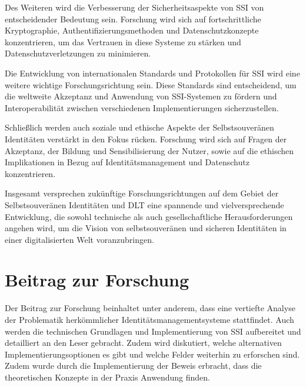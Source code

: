 Des Weiteren wird die Verbesserung der Sicherheitsaspekte von SSI von entscheidender Bedeutung sein. Forschung wird sich auf fortschrittliche Kryptographie, Authentifizierungsmethoden und Datenschutzkonzepte konzentrieren, um das Vertrauen in diese Systeme zu stärken und Datenschutzverletzungen zu minimieren.

Die Entwicklung von internationalen Standards und Protokollen für SSI wird eine weitere wichtige Forschungsrichtung sein. Diese Standards sind entscheidend, um die weltweite Akzeptanz und Anwendung von SSI-Systemen zu fördern und Interoperabilität zwischen verschiedenen Implementierungen sicherzustellen.

Schließlich werden auch soziale und ethische Aspekte der Selbstsouveränen Identitäten verstärkt in den Fokus rücken. Forschung wird sich auf Fragen der Akzeptanz, der Bildung und Sensibilisierung der Nutzer, sowie auf die ethischen Implikationen in Bezug auf Identitätsmanagement und Datenschutz konzentrieren.

Insgesamt versprechen zukünftige Forschungsrichtungen auf dem Gebiet der Selbstsouveränen Identitäten und DLT eine spannende und vielversprechende Entwicklung, die sowohl technische als auch gesellschaftliche Herausforderungen angehen wird, um die Vision von selbstsouveränen und sicheren Identitäten in einer digitalisierten Welt voranzubringen.

\section{Beitrag zur Forschung}
Der Beitrag zur Forschung beinhaltet unter anderem, dass eine vertiefte Analyse der Problematik herkömmlicher Identitätsmanagementsysteme stattfindet. Auch werden die technischen Grundlagen und Implementierung von SSI aufbereitet und detailliert an den Leser gebracht. Zudem wird diskutiert, welche alternativen Implementierungsoptionen es gibt und welche Felder weiterhin zu erforschen sind. Zudem wurde durch die Implementierung der Beweis erbracht, dass die theoretischen Konzepte in der Praxis Anwendung finden.
